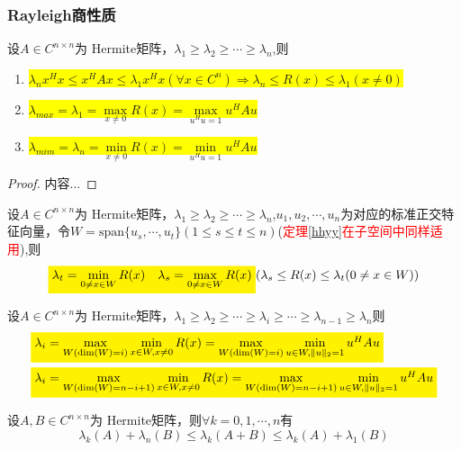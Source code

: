 \subsubsection{Rayleigh商性质}
\begin{theorem}
	\label{hhyy}
设$A\in C^{n\times n}$为 Hermite矩阵，$\lambda_1\geq\lambda_2\geq\cdots\geq \lambda_n$,则
	\begin{enumerate}
		\item \colorbox{yellow}{$\lambda_nx^Hx\leq x^HAx\leq \lambda_1x^Hx(\forall x \in C^n) \Rightarrow \lambda_n\leq R(x)\leq \lambda_1(x\ne 0) $ }
		\item\colorbox{yellow}{$\lambda_{max}=\lambda_{1}=\max\limits_{x\ne 0}R(x)=\max\limits_{u^Hu=1}u^HAu$}
		\item\colorbox{yellow}{$\lambda_{mim}=\lambda_{n}=\min\limits_{x\ne 0}R(x)=\min\limits_{u^Hu=1}u^HAu$}
	\end{enumerate}
\end{theorem}
\begin{proof}
	内容...
\end{proof}



\begin{theorem}
	设$A\in C^{n\times n}$为 Hermite矩阵，$\lambda_1\geq\lambda_2\geq\cdots\geq \lambda_n$,$u_1,u_2,\cdots, u_n$为对应的标准正交特征向量，令$W=\mathrm{span}\{u_s,\cdots,u_t\}(1\leq s \leq t\leq n)$(\textcolor{red}{定理\ref{hhyy}在子空间中同样适用}),则
	\[\colorbox{yellow}{$
	\lambda_t=\min\limits_{0\ne x\in W}R(x)\quad\lambda_s=\max\limits_{0\ne x\in W}R(x)$}(\lambda_s\leq R(x)\leq \lambda_t(0 \ne x \in W))
	\]
\end{theorem}



\begin{theorem}
	设$A\in C^{n\times n}$为 Hermite矩阵，$\lambda_1\geq\lambda_2\geq\cdots\geq \lambda_i\geq\cdots\geq\lambda_{n-1}\geq \lambda_n$则
	\[\begin{split}
	&\colorbox{yellow}{$\lambda_i=\max\limits_{W(\mathrm{dim}(W)=i)}\min\limits_{x\in W,x\ne 0}R(x)=\max\limits_{W(\mathrm{dim}(W)=i)}\min\limits_{u\in W,\|u\|_2= 1}u^HAu$}\\
	&\colorbox{yellow}{$\lambda_i=\max\limits_{W(\mathrm{dim}(W)=n-i+1)}\min\limits_{x\in W,x\ne 0}R(x)=\max\limits_{W(\mathrm{dim}(W)=n-i+1)}\min\limits_{u\in W,\|u\|_2= 1}u^HAu$}
\end{split}
	\]
\end{theorem}

\begin{theorem}
	设$A,B\in C^{n\times n}$为 Hermite矩阵，则$\forall k=0,1,\cdots,n$有
	\[
	\lambda_k(A)+\lambda_{n}(B)\leq \lambda_k(A+B)\leq \lambda_k(A)+\lambda_{1}(B)
	\]
\end{theorem}






